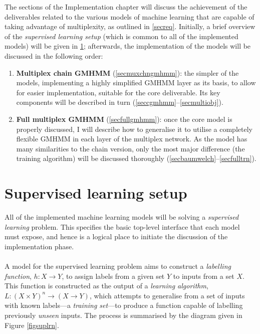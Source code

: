 \documentclass[12pt,a4paper,twoside,openright]{report}
\begin{document}
The sections of the Implementation chapter will discuss the achievement of the deliverables related to the various models of machine learning that are capable of taking advantage of multiplexity, as outlined in \cref{secreq}. Initially, a brief overview of the \emph{supervised learning setup} (which is common to all of the implemented models) will be given in \cref{secsuplrn}; afterwards, the implementation of the models will be discussed in the following order:
\begin{enumerate}
	\item {\bf Multiplex chain GMHMM} (\cref{secmuxchngmhmm}): the simpler of the models, implementing a highly simplified GMHMM layer as its basis, to allow for easier implementation, suitable for the core deliverable. Its key components will be described in turn (\cref{seccgmhmm}--\ref{secmultiobj}).
	\item {\bf Full multiplex GMHMM} (\cref{secfullgmhmm}): once the core model is properly discussed, I will describe how to generalise it to utilise a completely flexible GMHMM in each layer of the multiplex network. As the model has many similarities to the chain version, only the most major difference (the training algorithm) will be discussed thoroughly (\cref{secbaumwelch}--\ref{secfulltrn}).
\end{enumerate}

\section{Supervised learning setup}\label{secsuplrn}

All of the implemented machine learning models will be solving a \emph{supervised learning} \cite{mohri2012foundations} problem. This specifies the basic top-level interface that each model must expose, and hence is a logical place to initiate the discussion of the implementation phase.\\ \\
A model for the supervised learning problem aims to construct a \emph{labelling function}, $h : X \rightarrow Y$, to assign labels from a given set $Y$ to inputs from a set $X$. This function is constructed as the output of a \emph{learning algorithm}, $L : (X \times Y)^n \rightarrow (X \rightarrow Y)$, which attempts to generalise from a set of inputs with known labels---a \emph{training set}---to produce a function capable of labelling previously \emph{unseen} inputs. The process is summarised by the diagram given in Figure \ref{figsuplrn}.
\end{document}
